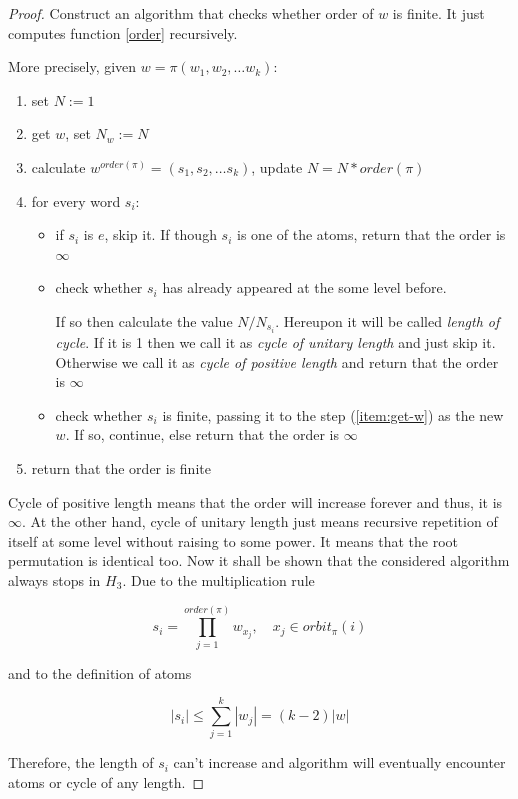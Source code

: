 \documentclass[a4paper,12pt]{amsart}
\begin{document}
\begin{proof}
	Construct an algorithm that checks whether order of $w$ is finite. It just computes function \ref{order} recursively. 
	
	More precisely, given $w = \pi (w_1, w_2, \dots w_k)$: 
	\begin{enumerate}
		\item set $N := 1$
		\item \label{item:get-w} get $w$, set $N_w := N$
		\item calculate $w^{order(\pi)} = (s_1, s_2, \dots s_k)$, update $N = N * order(\pi)$
		\item \label{item:every-word} for every word $s_i$:
		
		\begin{itemize}
			\item if $s_i$ is $e$, skip it. If though $s_i$ is one of the atoms, return that the order is $\infty$
			\item check whether $s_i$ has already appeared at the some level before. 
			
			If so then calculate the value $N/N_{s_i}$. Hereupon it will be called \textit{length of cycle}. If it is 1 then we call it as \textit{cycle of unitary length} and just skip it. Otherwise we call it as \textit{cycle of positive length} and return that the order is $\infty$
			
			\item check whether $s_i$ is finite, passing it to the step (\ref{item:get-w}) as the new $w$. If so, continue, else return that the order is $\infty$
		\end{itemize}
		\item return that the order is finite
	\end{enumerate}
	
	Cycle of positive length means that the order will increase forever and thus, it is $\infty$. At the other hand, cycle of unitary length just means recursive repetition of itself at some level without raising to some power. It means that the root permutation is identical too. Now it shall be shown that the considered algorithm always stops in $H_3$. Due to the multiplication rule 

	\begin{equation}
		\label{equation:orbits}
		s_i = \prod_{j=1}^{order(\pi)} w_{x_j}, \quad x_j \in orbit_{\pi}(i)
	\end{equation}
	
	
	and to the definition of atoms
	
	$$|s_i| \le \sum_{j=1}^{k} |w_j| = (k-2)|w|$$
	
	Therefore, the length of $s_i$ can't increase and algorithm will eventually encounter atoms or cycle of any length. 
		
\end{proof}
\end{document}
